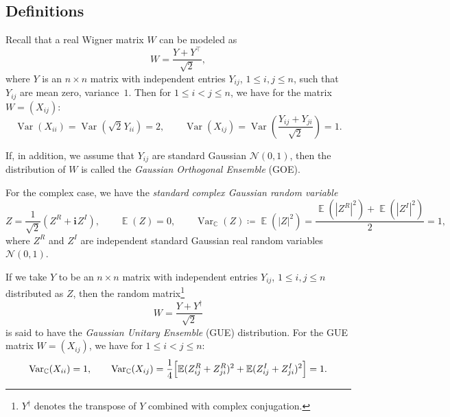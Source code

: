 \documentclass[letterpaper,11pt,oneside,reqno]{book}
\numberwithin{equation}{chapter}  %
\newcommand{\ssp}{\hspace{1pt}}
\theoremstyle{definition}
\begin{document}
\subsection{Definitions}
\label{lecture3:sub:GOE_GUE_definitons}

Recall that a real Wigner matrix $W$ can be modeled as
\begin{equation*}
	W=\frac{Y+Y^\top}{\sqrt{2}},
\end{equation*}
where $Y$ is an $n\times n$ matrix with independent entries $Y_{ij}$,
$1\le i,j\le n$, such that $Y_{ij}$ are mean zero, variance~$1$.
Then for $1\le i<j\le n$, we have for the matrix
$W=(X_{ij})$:
\begin{equation*}
	\operatorname{\mathrm{Var}}\left( X_{ii} \right)=
	\operatorname{\mathrm{Var}}( \sqrt 2\ssp Y_{ii} )=2,\qquad
	\operatorname{\mathrm{Var}}\left( X_{ij} \right)=
	\operatorname{\mathrm{Var}}\left( \frac{Y_{ij}+Y_{ji}}{\sqrt 2} \right)=1.
\end{equation*}

If, in addition, we assume that $Y_{ij}$ are standard Gaussian
$\mathcal{N}(0,1)$, then the distribution of $W$ is called
the \emph{Gaussian Orthogonal Ensemble} (GOE).

For the complex case, we
have the \emph{standard complex Gaussian random variable}
\begin{equation*}
	Z=\frac{1}{\sqrt 2}\left( Z^R+\mathbf{i}\ssp Z^I \right),
	\qquad
	\operatorname{\mathbb{E}} (Z)=0,
	\qquad
	\operatorname{\mathrm{Var}}_{\mathbb{C}}(Z)\coloneqq
	\operatorname{\mathbb{E}} (|Z|^2)=
	\frac{
	\operatorname{\mathbb{E}} (|Z^R|^2)+
	\operatorname{\mathbb{E}} (|Z^I|^2)}{2}=1
	,
\end{equation*}
where $Z^R$ and $Z^I$ are independent
standard Gaussian real random variables $\mathcal{N}(0,1)$.

If we take $Y$ to be an $n\times n$ matrix with independent
entries $Y_{ij}$, $1\le i,j\le n$
distributed as $Z$, then the random matrix\footnote{$Y^\dagger$ denotes the transpose of $Y$ combined with complex conjugation.}
\begin{equation*}
	W=\frac{Y+Y^\dagger}{\sqrt 2}
\end{equation*}
is said to have the \emph{Gaussian Unitary Ensemble} (GUE) distribution.
For the GUE matrix $W=(X_{ij})$,
we have for $1\le i<j\le n$:
\begin{equation*}
	\operatorname{\mathrm{Var}}_{\mathbb{C}}(X_{ii})=1,
	\qquad
	\operatorname{\mathrm{Var}}_{\mathbb{C}}(X_{ij})
	=\frac{1}{4}
	\Bigl[ \operatorname{\mathbb{E}}(Z_{ij}^R
			+
		Z_{ji}^R)^2
		+
		\operatorname{\mathbb{E}}(Z_{ij}^I
			+
		Z_{ji}^I)^2
	\Bigr]
	=1.
\end{equation*}
\end{document}

